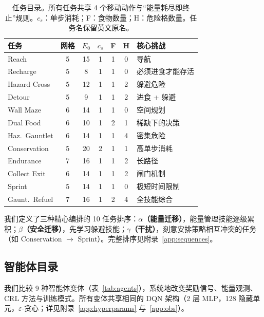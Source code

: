 \documentclass[zihao=5,a4paper,linespread=1.3,fontset=fandol]{ctexart}
\newcommand{\energy}{E}
\begin{document}
\begin{table}[t]
\centering
\caption{任务目录。所有任务共享 4 个移动动作与“能量耗尽即终止”规则。$c_s$：单步消耗；F：食物数量；H：危险格数量。任务名保留英文原名。}
\label{tab:tasks}
\small
\setlength{\tabcolsep}{5pt}
\begin{tabular}{@{}lcccccl@{}}
\toprule
\textbf{任务} & \textbf{网格} & $\energy_0$ & $c_s$ &
\textbf{F} & \textbf{H} & \textbf{核心挑战} \\
\midrule
Reach          & 5 & 15 & 1 & 1 & 0 & 导航 \\
Recharge       & 5 &  8 & 1 & 1 & 0 & 必须进食才能存活 \\
Hazard Cross   & 5 & 12 & 1 & 1 & 2 & 躲避危险 \\
Detour         & 5 &  9 & 1 & 1 & 2 & 进食 + 躲避 \\
Wall Maze      & 6 & 14 & 1 & 1 & 0 & 空间规划 \\
Dual Food      & 6 & 10 & 1 & 2 & 1 & 稀缺下的决策 \\
Haz.~Gauntlet  & 6 & 14 & 1 & 1 & 4 & 密集危险 \\
Conservation   & 5 & 20 & 2 & 1 & 1 & 高单步消耗 \\
Endurance      & 7 & 16 & 1 & 1 & 2 & 长路径 \\
Collect Exit   & 6 & 14 & 1 & 1 & 2 & 闸门机制 \\
Sprint         & 5 & 14 & 1 & 1 & 0 & 极短时间限制 \\
Gaunt.~Refuel  & 7 & 16 & 1 & 2 & 4 & 全技能综合 \\
\bottomrule
\end{tabular}
\end{table}

我们定义了三种精心编排的 10 任务排序：\textbf{$\alpha$（能量迁移）}，能量管理技能逐级累积；\textbf{$\beta$（安全迁移）}，先学习躲避技能；\textbf{$\gamma$（干扰）}，刻意安排策略相互冲突的任务（如 Conservation $\to$ Sprint）。完整排序见附录~\ref{app:sequences}。

\subsection{智能体目录}

我们比较 9 种智能体变体（表~\ref{tab:agents}），系统地改变奖励信号、能量观测、CRL 方法与训练模式。所有变体共享相同的 DQN 架构（2 层 MLP，128 隐藏单元，$\varepsilon$-贪心；详见附录~\ref{app:hyperparams} 与~\ref{app:obs}）。
\end{document}
